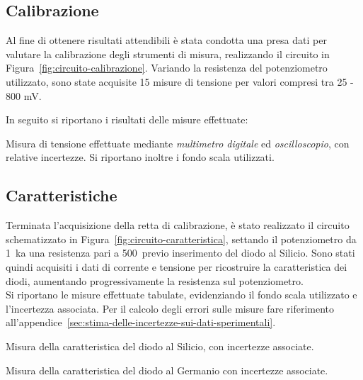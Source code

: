 \documentclass[@MAIN@]{subfiles}
\begin{document}
    \subsection*{Calibrazione}
    Al fine di ottenere risultati attendibili è stata condotta una presa dati per valutare la
    calibrazione degli strumenti di misura, realizzando il circuito in Figura~\ref{fig:circuito-calibrazione}. Variando
    la resistenza del potenziometro utilizzato, sono state acquisite 15 misure di tensione per valori compresi tra 25 - 800 mV. \newline

    \noindent In seguito si riportano i risultati delle misure effettuate: \\

    \begin{table}[ht]
        \centering
        
        \caption{Misura di tensione effettuate mediante \textit{multimetro digitale} ed \textit{oscilloscopio},
            con relative incertezze. Si riportano inoltre i fondo scala utilizzati.}
        \label{tab:calibrazione}
    \end{table}
    \vspace{-0.1cm}

    \subsection*{Caratteristiche}
    Terminata l'acquisizione della retta di calibrazione, è stato realizzato il circuito schematizzato
    in Figura~\ref{fig:circuito-caratteristica}, settando il potenziometro da 1~k\textohm\;a una resistenza pari
    a 500~\textohm\;previo inserimento del diodo al Silicio.
    Sono stati quindi acquisiti i dati di corrente e
    tensione per ricostruire la caratteristica dei diodi, aumentando
    progressivamente la resistenza sul potenziometro. \\

    Si riportano le misure effettuate tabulate, evidenziando il fondo
    scala utilizzato e l'incertezza associata.
    Per il calcolo degli errori sulle misure fare riferimento
    all'appendice~\ref{sec:stima-delle-incertezze-sui-dati-sperimentali}.\newline


    \begin{table}[!ht]
        \centering
        
        \captionsetup{justification=centering} %
        \caption{Misura della caratteristica del diodo al Silicio, con incertezze associate.}
        \label{tab:silicio}

    \end{table}

    \vspace{1.5pt}
    \begin{table}[!ht]
        \centering
        
        \captionsetup{justification=centering} %
        \caption{Misura della caratteristica del diodo al Germanio con incertezze associate.}
        \label{tab:germanio}
    \end{table}
\end{document}
